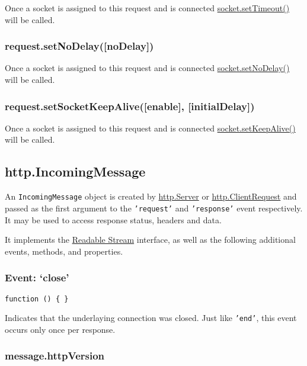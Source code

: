Once a socket is assigned to this request and is connected
\href{net.html\#net_socket_settimeout_timeout_callback}{socket.setTimeout()}
will be called.

\subsubsection{request.setNoDelay({[}noDelay{]})}\label{request.setnodelaynodelay}

Once a socket is assigned to this request and is connected
\href{net.html\#net_socket_setnodelay_nodelay}{socket.setNoDelay()} will
be called.

\subsubsection{request.setSocketKeepAlive({[}enable{]},
{[}initialDelay{]})}\label{request.setsocketkeepaliveenable-initialdelay}

Once a socket is assigned to this request and is connected
\href{net.html\#net_socket_setkeepalive_enable_initialdelay}{socket.setKeepAlive()}
will be called.

\subsection{http.IncomingMessage}\label{http.incomingmessage}

An \texttt{IncomingMessage} object is created by
\hyperref[httpux5fclassux5fhttpux5fserver]{http.Server} or
\hyperref[httpux5fclassux5fhttpux5fclientrequest]{http.ClientRequest}
and passed as the first argument to the \texttt{'request'} and
\texttt{'response'} event respectively. It may be used to access
response status, headers and data.

It implements the \href{stream.html\#stream_readable_stream}{Readable
Stream} interface, as well as the following additional events, methods,
and properties.

\subsubsection{Event: `close'}\label{event-close-2}

\texttt{function () \{ \}}

Indicates that the underlaying connection was closed. Just like
\texttt{'end'}, this event occurs only once per response.

\subsubsection{message.httpVersion}\label{message.httpversion}

